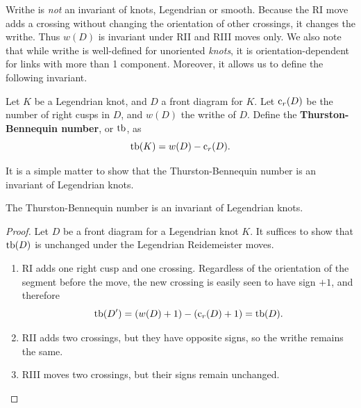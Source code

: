 Writhe is \emph{not} an invariant of knots, Legendrian or smooth. Because the RI move adds a crossing without changing the orientation of other crossings, it changes the writhe. Thus $w(D)$ is invariant under RII and RIII moves only. We also note that while writhe is well-defined for unoriented \emph{knots}, it is orientation-dependent for links with more than 1 component. Moreover, it allows us to define the following invariant.

\begin{definition}
    Let $K$ be a Legendrian knot, and $D$ a front diagram for $K$. Let $\operatorname{c}_r(D)$ be the number of right cusps in $D$, and $w(D)$ the writhe of $D$.
    Define the \textbf{Thurston-Bennequin number}, or $\operatorname{tb}$, as
    \[
        \operatorname{tb}(K) = w(D) - \operatorname{c}_r(D).
    \]
\end{definition}

It is a simple matter to show that the Thurston-Bennequin number is an invariant of Legendrian knots.

\begin{proposition}
    The Thurston-Bennequin number is an invariant of Legendrian knots.
\end{proposition}
\begin{proof}
    Let $D$ be a front diagram for a Legendrian knot $K$. It suffices to show that $\operatorname{tb}(D)$ is unchanged under the Legendrian Reidemeister moves.

    \begin{enumerate}
        \item RI adds one right cusp and one crossing. Regardless of the orientation of the segment before the move, the new crossing is easily seen to have sign $+1$, and therefore
            \[
                \operatorname{tb}(D') = (w(D) + 1) - (\operatorname{c}_r(D) + 1) = \operatorname{tb}(D).
            \]
        \item RII adds two crossings, but they have opposite signs, so the writhe remains the same.
        \item RIII moves two crossings, but their signs remain unchanged.
    \end{enumerate}
    
\end{proof}


